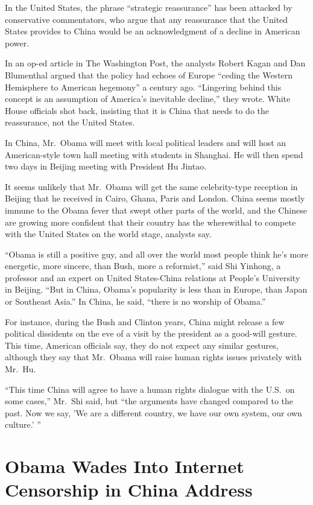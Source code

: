 ﻿\documentclass[12pt]{article}
\begin{document}
In the United States, the phrase ``strategic reassurance'' has been attacked by conservative
commentators, who argue that any reassurance that the United States provides to China would be an
acknowledgment of a decline in American power.

In an op-ed article in The Washington Post, the analysts Robert Kagan and Dan Blumenthal argued that
the policy had echoes of Europe ``ceding the Western Hemisphere to American hegemony'' a century
ago. ``Lingering behind this concept is an assumption of America's inevitable decline,'' they wrote.
White House officials shot back, insisting that it is China that needs to do the reassurance, not
the United States.

In China, Mr.~Obama will meet with local political leaders and will host an American-style town hall
meeting with students in Shanghai. He will then spend two days in Beijing meeting with President Hu
Jintao.

It seems unlikely that Mr.~Obama will get the same celebrity-type reception in Beijing that he
received in Cairo, Ghana, Paris and London. China seems mostly immune to the Obama fever that swept
other parts of the world, and the Chinese are growing more confident that their country has the
wherewithal to compete with the United States on the world stage, analysts say.

``Obama is still a positive guy, and all over the world most people think he's more energetic, more
sincere, than Bush, more a reformist,'' said Shi Yinhong, a professor and an expert on United
States-China relations at People's University in Beijing. ``But in China, Obama's popularity is less
than in Europe, than Japan or Southeast Asia.'' In China, he said, ``there is no worship of Obama.''

For instance, during the Bush and Clinton years, China might release a few political dissidents on
the eve of a visit by the president as a good-will gesture. This time, American officials say, they
do not expect any similar gestures, although they say that Mr.~Obama will raise human rights issues
privately with Mr.~Hu.

``This time China will agree to have a human rights dialogue with the U.S.~on some cases,'' Mr.~Shi
said, but ``the arguments have changed compared to the past. Now we say, 'We are a different
country, we have our own system, our own culture.' ''

\section{Obama Wades Into Internet Censorship in China Address}
\end{document}
